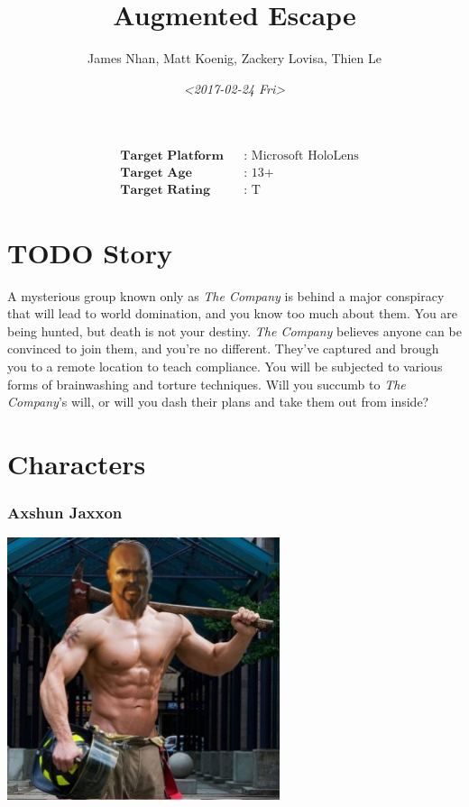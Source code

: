 \documentclass[11pt]{article}
\author{James Nhan, Matt Koenig, Zackery Lovisa, Thien Le}
\date{\textit{<2017-02-24 Fri>}}
\title{Augmented Escape}
\begin{document}
\maketitle
\begin{align*}
   &\textbf{Target Platform}&&\text{: Microsoft HoloLens} \\
   &\textbf{Target Age}&&\text{: 13+} \\
   &\textbf{Target Rating}&&\text{: T}
\end{align*}

\pagebreak

\tableofcontents

\pagebreak

\section{{\bfseries\sffamily TODO} Story}
\label{sec:orgf86cfa7}
A mysterious group known only as \emph{The Company} is behind a major conspiracy that will lead to world domination, and you know too much about them. You are being hunted, but death is not your destiny. \emph{The Company} believes anyone can be convinced to join them, and you're no different. They've captured and brough you to a remote location to teach compliance. You will be subjected to various forms of brainwashing and torture techniques. Will you succumb to \emph{The Company}'s will, or will you dash their plans and take them out from inside?

\section{Characters}
\label{sec:org48a8595}
\subsubsection{Axshun Jaxxon}
\label{sec:orgec90958}
\begin{center}
\includegraphics[width=8cm]{./img/axshun-jaxxon.png}
\end{center}
\end{document}
